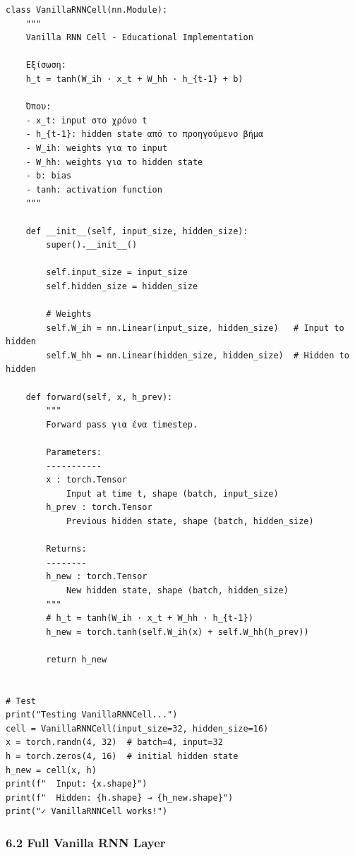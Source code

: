 \begin{lstlisting}
class VanillaRNNCell(nn.Module):
    """
    Vanilla RNN Cell - Educational Implementation
 
    Εξίσωση:
    h_t = tanh(W_ih · x_t + W_hh · h_{t-1} + b)
 
    Όπου:
    - x_t: input στο χρόνο t
    - h_{t-1}: hidden state από το προηγούμενο βήμα
    - W_ih: weights για το input
    - W_hh: weights για το hidden state
    - b: bias
    - tanh: activation function
    """
 
    def __init__(self, input_size, hidden_size):
        super().__init__()
 
        self.input_size = input_size
        self.hidden_size = hidden_size
 
        # Weights
        self.W_ih = nn.Linear(input_size, hidden_size)   # Input to hidden
        self.W_hh = nn.Linear(hidden_size, hidden_size)  # Hidden to hidden
 
    def forward(self, x, h_prev):
        """
        Forward pass για ένα timestep.
 
        Parameters:
        -----------
        x : torch.Tensor
            Input at time t, shape (batch, input_size)
        h_prev : torch.Tensor
            Previous hidden state, shape (batch, hidden_size)
 
        Returns:
        --------
        h_new : torch.Tensor
            New hidden state, shape (batch, hidden_size)
        """
        # h_t = tanh(W_ih · x_t + W_hh · h_{t-1})
        h_new = torch.tanh(self.W_ih(x) + self.W_hh(h_prev))
 
        return h_new
 
 
# Test
print("Testing VanillaRNNCell...")
cell = VanillaRNNCell(input_size=32, hidden_size=16)
x = torch.randn(4, 32)  # batch=4, input=32
h = torch.zeros(4, 16)  # initial hidden state
h_new = cell(x, h)
print(f"  Input: {x.shape}")
print(f"  Hidden: {h.shape} → {h_new.shape}")
print("✓ VanillaRNNCell works!")
\end{lstlisting}
 
\subsubsection*{6.2 Full Vanilla RNN Layer}
 
